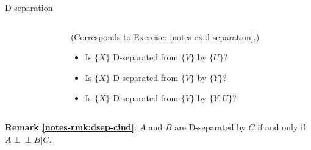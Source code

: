 \documentclass{beamer}
\newcommand{\indep}{\perp\!\!\!\perp}
\newcommand{\remark}[2]{\noindent\colorbox{red!10}{\parbox{0.995\textwidth}{\textbf{Remark \ref{notes-rmk:#1}}: #2}}\\}
\begin{document}
\begin{frame}{D-separation}
\begin{columns}
\begin{column}{0.25\textwidth}
    \end{column}\hspace{2mm}
   \begin{column}{0.7\textwidth}
   {\small (Corresponds to Exercise: \ref{notes-ex:d-separation}.)}
    \begin{itemize}
     \item<2-> Is {$\{X\}$} D-separated from {$\{V\}$} by {$\{U\}$}? 
     \item<3-> Is {$\{X\}$} D-separated from {$\{V\}$} by {$\{Y\}$}? 
     \item<4-> Is {$\{X\}$} D-separated from {$\{V\}$} by {$\{Y,U\}$}? 
    \end{itemize}

   \end{column}
  \end{columns}\vspace{3mm}
  \remark{dsep-cind}{$A$ and $B$ are D-separated by $C$ if and only if $A \indep B | C$.}
\end{frame}
\end{document}
